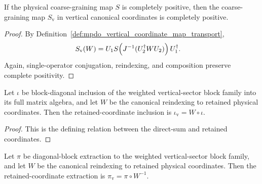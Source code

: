 \begin{lemma}
    \label{lem:mpdo_transport_s_vertical_coordinates_cp}
    \leanok
    If the physical coarse-graining map $S$ is completely positive, then the
    coarse-graining map $S_{\mathrm v}$ in vertical canonical coordinates is
    completely positive.
\end{lemma}

\begin{proof}\leanok
    By Definition~\ref{def:mpdo_vertical_coordinate_map_transport},
    \begin{align}
        S_{\mathrm v}(W)
         & =U_1S\!\left(J^{-1}(U_2^\dagger WU_2)\right)U_1^\dagger.
        \notag
    \end{align}
    Again, single-operator conjugation, reindexing, and composition preserve
    complete positivity.
\end{proof}

\begin{lemma}
    \label{lem:mpdo_vertical_sector_block_diagonal_reindex}
    \leanok
    Let $\iota$ be block-diagonal inclusion of the weighted vertical-sector
    block family into its full matrix algebra, and let $W$ be the canonical
    reindexing to retained physical coordinates. Then the retained-coordinate
    inclusion is $\iota_{\mathrm v}=W\circ\iota$.
\end{lemma}

\begin{proof}\leanok
    This is the defining relation between the direct-sum and retained
    coordinates.
\end{proof}

\begin{lemma}
    \label{lem:mpdo_vertical_sector_blocks_reindex}
    \leanok
    Let $\pi$ be diagonal-block extraction to the weighted vertical-sector
    block family, and let $W$ be the canonical reindexing to retained physical
    coordinates. Then the retained-coordinate extraction is
    $\pi_{\mathrm v}=\pi\circ W^{-1}$.
\end{lemma}

